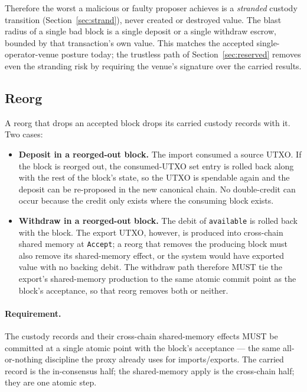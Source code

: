Therefore the worst a malicious or faulty proposer achieves is a
\emph{stranded} custody transition (Section~\ref{sec:strand}), never
created or destroyed value. The blast radius of a single bad block is a
single deposit or a single withdraw escrow, bounded by that
transaction's own value. This matches the accepted single-operator-venue
posture today; the trustless path of Section~\ref{sec:reserved} removes
even the stranding risk by requiring the venue's signature over the
carried results.

\subsection{Reorg}

A reorg that drops an accepted block drops its carried custody records
with it. Two cases:

\begin{itemize}[leftmargin=2em,nosep]
\item \textbf{Deposit in a reorged-out block.} The import consumed a
  source UTXO. If the block is reorged out, the consumed-UTXO set entry
  is rolled back along with the rest of the block's state, so the UTXO
  is spendable again and the deposit can be re-proposed in the new
  canonical chain. No double-credit can occur because the credit only
  exists where the consuming block exists.
\item \textbf{Withdraw in a reorged-out block.} The debit of
  \texttt{available} is rolled back with the block. The export UTXO,
  however, is produced into cross-chain shared memory at
  \texttt{Accept}; a reorg that removes the producing block must also
  remove its shared-memory effect, or the system would have exported
  value with no backing debit. The withdraw path therefore MUST tie the
  export's shared-memory production to the same atomic commit point as
  the block's acceptance, so that reorg removes both or neither.
\end{itemize}

\paragraph{Requirement.} The custody records and their cross-chain
shared-memory effects MUST be committed at a single atomic point with
the block's acceptance --- the same all-or-nothing discipline the proxy
already uses for imports/exports. The carried record is the
in-consensus half; the shared-memory apply is the cross-chain half; they
are one atomic step.

